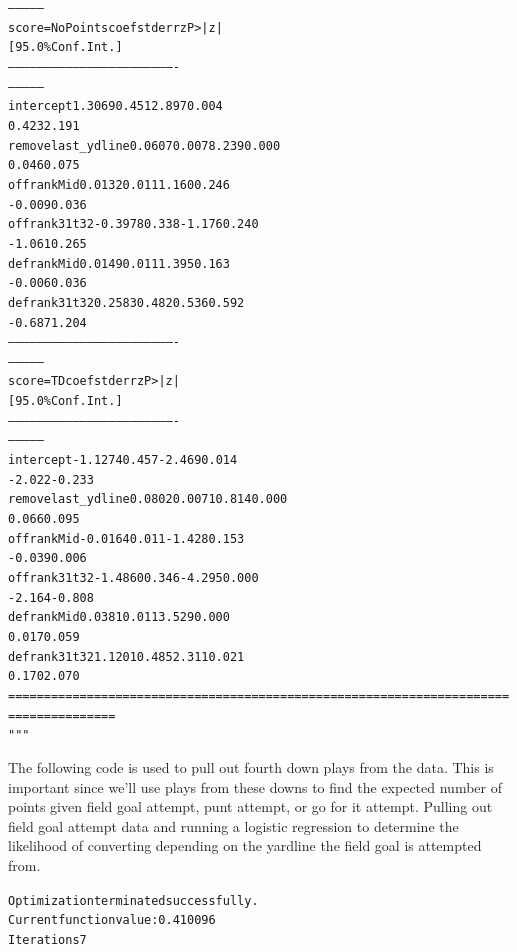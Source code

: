 \documentclass[letterpaper,10pt,english]{/anaconda/lib/python2.7/site-packages/sphinx/texinputs/sphinxhowto}
\newenvironment{InvisibleVerbatim}
        {\begin{mdframed}[leftmargin=0.1\linewidth,innerleftmargin=3pt,innerrightmargin=3pt, userdefinedwidth=1\linewidth, linewidth=0pt, linecolor=white, usetwoside=false]}
        {\end{mdframed}}
\begin{document}
\begin{InvisibleVerbatim}
\begin{alltt}
---------------
   score=NoPoints       coef    std err          z      P>|z|
[95.0\% Conf. Int.]
----------------------------------------------------------------------
---------------
intercept             1.3069      0.451      2.897      0.004
0.423     2.191
removelast\_ydline     0.0607      0.007      8.239      0.000
0.046     0.075
offrankMid            0.0132      0.011      1.160      0.246
-0.009     0.036
offrank31t32         -0.3978      0.338     -1.176      0.240
-1.061     0.265
defrankMid            0.0149      0.011      1.395      0.163
-0.006     0.036
defrank31t32          0.2583      0.482      0.536      0.592
-0.687     1.204
----------------------------------------------------------------------
---------------
         score=TD       coef    std err          z      P>|z|
[95.0\% Conf. Int.]
----------------------------------------------------------------------
---------------
intercept            -1.1274      0.457     -2.469      0.014
-2.022    -0.233
removelast\_ydline     0.0802      0.007     10.814      0.000
0.066     0.095
offrankMid           -0.0164      0.011     -1.428      0.153
-0.039     0.006
offrank31t32         -1.4860      0.346     -4.295      0.000
-2.164    -0.808
defrankMid            0.0381      0.011      3.529      0.000
0.017     0.059
defrank31t32          1.1201      0.485      2.311      0.021
0.170     2.070
======================================================================
===============
"""\end{alltt}

            \end{InvisibleVerbatim}
            
        
    
The following code is used to pull out fourth down plays from the data.
This is important since we'll use plays from these downs to find the
expected number of points given field goal attempt, punt attempt, or go
for it attempt.
Pulling out field goal attempt data and running a logistic regression to
determine the likelihood of converting depending on the yardline the
field goal is attempted from.

    

        
        

            
                \begin{InvisibleVerbatim}
                \vspace{-0.5\baselineskip}
\begin{alltt}Optimization terminated successfully.
         Current function value: 0.410096
         Iterations 7
\end{alltt}

            \end{InvisibleVerbatim}
            
\end{document}
